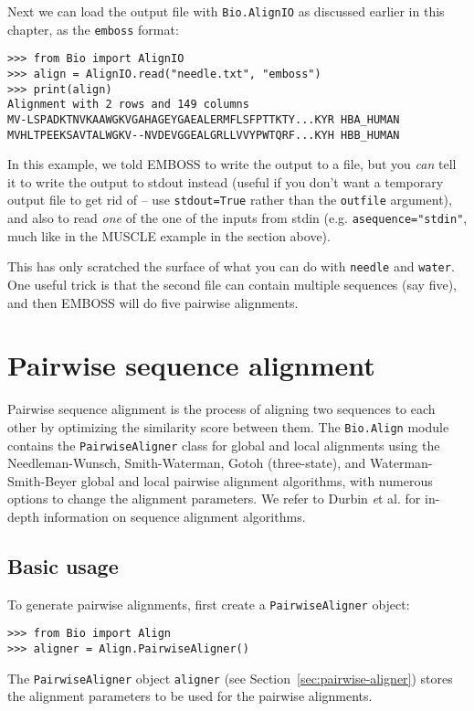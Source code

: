 Next we can load the output file with \verb|Bio.AlignIO| as
discussed earlier in this chapter, as the \texttt{emboss} format:

\begin{verbatim}
>>> from Bio import AlignIO
>>> align = AlignIO.read("needle.txt", "emboss")
>>> print(align)
Alignment with 2 rows and 149 columns
MV-LSPADKTNVKAAWGKVGAHAGEYGAEALERMFLSFPTTKTY...KYR HBA_HUMAN
MVHLTPEEKSAVTALWGKV--NVDEVGGEALGRLLVVYPWTQRF...KYH HBB_HUMAN
\end{verbatim}

In this example, we told EMBOSS to write the output to a file, but you
\emph{can} tell it to write the output to stdout instead (useful if you
don't want a temporary output file to get rid of -- use
\texttt{stdout=True} rather than the \texttt{outfile} argument), and
also to read \emph{one} of the one of the inputs from stdin (e.g.
\texttt{asequence="stdin"}, much like in the MUSCLE example in the
section above).

This has only scratched the surface of what you can do with \texttt{needle}
and \texttt{water}. One useful trick is that the second file can contain
multiple sequences (say five), and then EMBOSS will do five pairwise
alignments.


\section{Pairwise sequence alignment}
\label{sec:pairwise}

Pairwise sequence alignment is the process of aligning two sequences to each
other by optimizing the similarity score between them.  The \verb|Bio.Align|
module contains the \verb|PairwiseAligner| class for global and local
alignments using the Needleman-Wunsch, Smith-Waterman, Gotoh (three-state), and
Waterman-Smith-Beyer global and local pairwise alignment algorithms, with
numerous options to change the alignment parameters.
We refer to Durbin {\textit et al.} \cite{durbin1998} for in-depth information on sequence alignment algorithms.

\subsection{Basic usage}
\label{sec:pairwise-basic}

To generate pairwise alignments, first create a \verb+PairwiseAligner+ object:

\begin{verbatim}
>>> from Bio import Align
>>> aligner = Align.PairwiseAligner()
\end{verbatim}
The \verb+PairwiseAligner+ object \verb+aligner+
(see Section~\ref{sec:pairwise-aligner})
stores the alignment parameters to be used for the pairwise alignments.

